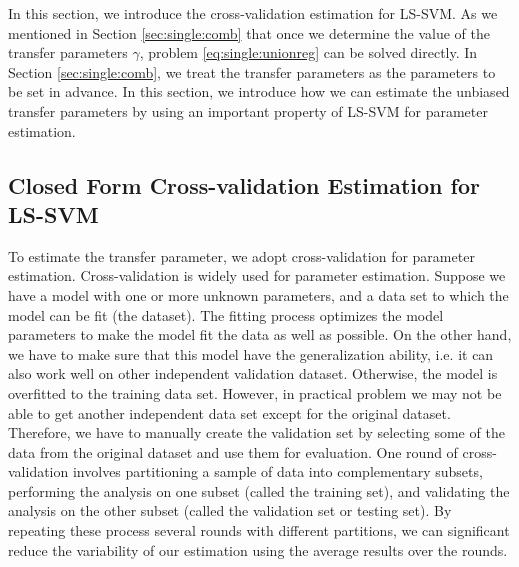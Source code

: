 In this section, we introduce the cross-validation estimation for LS-SVM. As we mentioned in Section \ref{sec:single:comb} that once we determine the value of the transfer parameters $\gamma$, problem \eqref{eq:single:unionreg} can be solved directly. In Section \ref{sec:single:comb}, we treat the transfer parameters as the parameters to be set in advance. In this section, we introduce how we can estimate the unbiased transfer parameters by using an important property of LS-SVM for parameter estimation. 

\subsection{Closed Form Cross-validation Estimation for LS-SVM}
To estimate the transfer parameter, we adopt cross-validation for parameter estimation. Cross-validation is widely used for parameter estimation. Suppose we have a model with one or more unknown parameters, and a data set to which the model can be fit (the dataset). The fitting process optimizes the model parameters to make the model fit the data as well as possible. On the other hand, we have to make sure that this model have the generalization ability, i.e. it can also work well on other independent validation dataset. Otherwise, the model is overfitted to the training data set. However, in practical problem we may not be able to get another independent data set except for the original dataset. Therefore, we have to manually create the validation set by selecting some of the data from the original dataset and use them for evaluation. One round of cross-validation involves partitioning a sample of data into complementary subsets, performing the analysis on one subset (called the training set), and validating the analysis on the other subset (called the validation set or testing set). By repeating these process several rounds with different partitions, we can significant reduce the variability of our estimation using the average results over the rounds.
